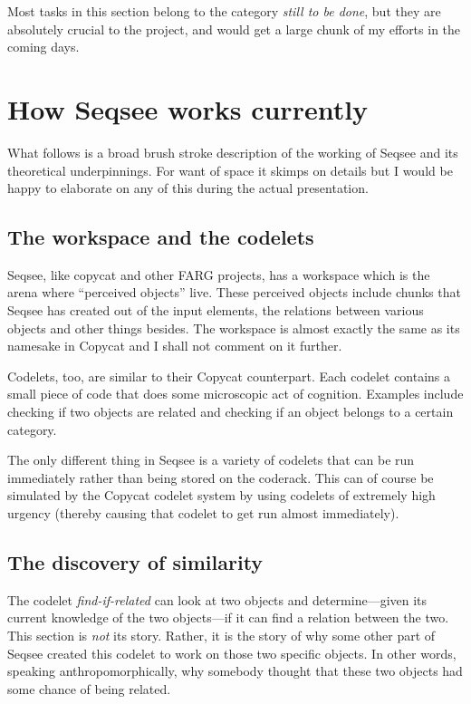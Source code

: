 \documentclass[letterpaper]{article}
\begin{document}
Most tasks in this section belong to the category \emph{still to be done}, but they are absolutely crucial to the project, and would get a large chunk of my efforts in the coming days.



\section{How Seqsee works currently}
\label{sec:how}

What follows is a broad brush stroke description of the working of Seqsee and its theoretical underpinnings.  For want of space it skimps on details but I would be happy to elaborate on any of this during the actual presentation.

\subsection{The workspace and the codelets}

Seqsee, like copycat and other FARG projects, has a workspace which is the arena where ``perceived objects'' live.  These perceived objects include chunks that Seqsee has created out of the input elements, the relations between various objects and other things besides.  The workspace is almost exactly the same as its namesake in Copycat and I shall not comment on it further.

Codelets, too, are similar to their Copycat counterpart. Each codelet contains a small piece of code that does some microscopic act of cognition.  Examples include checking if two objects are related and checking if an object belongs to a certain category.

The only different thing in Seqsee is a variety of codelets that can be run immediately rather than being stored on the coderack.  This can of course be simulated by the Copycat codelet system by using codelets of extremely high urgency (thereby causing that codelet to get run almost immediately).

\subsection{The discovery of similarity}

The codelet \emph{find-if-related} can look at two objects and determine---given its current knowledge of the two objects---if it can find a relation between the two.  This section is \emph{not} its story.  Rather, it is the story of why some other part of Seqsee created this codelet to work on those two specific objects.  In other words, speaking anthropomorphically, why somebody thought that these two objects had some chance of being related.
\end{document}
